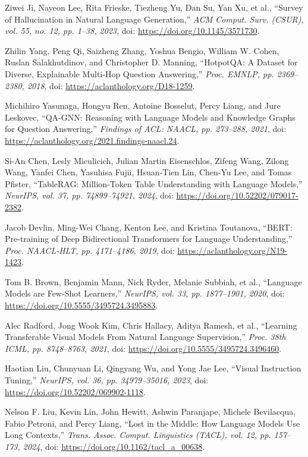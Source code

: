  Ziwei Ji, Nayeon Lee, Rita Frieske, Tiezheng Yu, Dan Su, Yan Xu, et al., ``Survey of Hallucination in Natural Language Generation,'' \emph{ACM Comput. Surv. (CSUR), vol. 55, no. 12, pp. 1--38, 2023}, doi: \url{https://doi.org/10.1145/3571730}.

 Zhilin Yang, Peng Qi, Saizheng Zhang, Yoshua Bengio, William W. Cohen, Ruslan Salakhutdinov, and Christopher D. Manning, ``HotpotQA: A Dataset for Diverse, Explainable Multi-Hop Question Answering,'' \emph{Proc. EMNLP, pp. 2369--2380, 2018}, doi: \url{https://aclanthology.org/D18-1259}.

 Michihiro Yasunaga, Hongyu Ren, Antoine Bosselut, Percy Liang, and Jure Leskovec, ``QA-GNN: Reasoning with Language Models and Knowledge Graphs for Question Answering,'' \emph{Findings of ACL: NAACL, pp. 273--288, 2021}, doi: \url{https://aclanthology.org/2021.findings-naacl.24}.

 Si-An Chen, Lesly Miculicich, Julian Martin Eisenschlos, Zifeng Wang, Zilong Wang, Yanfei Chen, Yasuhisa Fujii, Hsuan-Tien Lin, Chen-Yu Lee, and Tomas Pfister, ``TableRAG: Million-Token Table Understanding with Language Models,'' \emph{NeurIPS, vol. 37, pp. 74899--74921, 2024}, doi: \url{https://doi.org/10.52202/079017-2382}.

 Jacob Devlin, Ming-Wei Chang, Kenton Lee, and Kristina Toutanova, ``BERT: Pre-training of Deep Bidirectional Transformers for Language Understanding,'' \emph{Proc. NAACL-HLT, pp. 4171--4186, 2019}, doi: \url{https://aclanthology.org/N19-1423}.

 Tom B. Brown, Benjamin Mann, Nick Ryder, Melanie Subbiah, et al., ``Language Models are Few-Shot Learners,'' \emph{NeurIPS, vol. 33, pp. 1877--1901, 2020}, doi: \url{https://doi.org/10.5555/3495724.3495883}.

 Alec Radford, Jong Wook Kim, Chris Hallacy, Aditya Ramesh, et al., ``Learning Transferable Visual Models From Natural Language Supervision,'' \emph{Proc. 38th ICML, pp. 8748--8763, 2021}, doi: \url{https://doi.org/10.5555/3495724.3496460}.

 Haotian Liu, Chunyuan Li, Qingyang Wu, and Yong Jae Lee, ``Visual Instruction Tuning,'' \emph{NeurIPS, vol. 36, pp. 34979--35016, 2023}, doi: \url{https://doi.org/10.52202/069902-1118}.

 Nelson F. Liu, Kevin Lin, John Hewitt, Ashwin Paranjape, Michele Bevilacqua, Fabio Petroni, and Percy Liang, ``Lost in the Middle: How Language Models Use Long Contexts,'' \emph{Trans. Assoc. Comput. Linguistics (TACL), vol. 12, pp. 157--173, 2024}, doi: \url{https://doi.org/10.1162/tacl\_a\_00638}.

